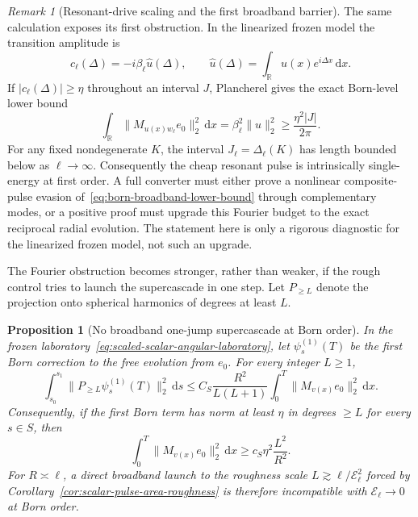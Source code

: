 \documentclass[11pt]{article}
\newcommand{\dd}{\,\mathrm d}
\newtheorem{proposition}[theorem]{Proposition}
\theoremstyle{definition}
\theoremstyle{remark}
\newtheorem{remark}[theorem]{Remark}
\begin{document}
\begin{remark}[Resonant-drive scaling and the first broadband barrier]
The same calculation exposes its first obstruction.  In the linearized
frozen model the transition amplitude is
\begin{equation}
 c_\ell(\Delta)=-i\beta_\ell\widehat u(\Delta),
 \qquad
 \widehat u(\Delta)=\int_\mathbb R u(x)e^{i\Delta x}\dd x.
 \label{eq:born-resonant-amplitude}
\end{equation}
If $|c_\ell(\Delta)|\geq\eta$ throughout an interval $J$, Plancherel gives
the exact Born-level lower bound
\begin{equation}
 \int_\mathbb R\|M_{u(x)w_\ell}e_0\|_2^2\dd x
 =\beta_\ell^2\|u\|_2^2
 \geq\frac{\eta^2|J|}{2\pi}.
 \label{eq:born-broadband-lower-bound}
\end{equation}
For any fixed nondegenerate $K$, the interval
$J_\ell=\Delta_\ell(K)$ has length bounded below as $\ell\to\infty$.
Consequently the cheap resonant pulse is intrinsically single-energy at first
order.  A full converter must either prove a nonlinear composite-pulse
evasion of~\eqref{eq:born-broadband-lower-bound} through complementary modes,
or a positive proof must upgrade this Fourier budget to the exact reciprocal
radial evolution.  The statement here is only a rigorous diagnostic for the
linearized frozen model, not such an upgrade.
\end{remark}

The Fourier obstruction becomes stronger, rather than weaker, if the rough
control tries to launch the supercascade in one step.  Let $P_{\geq L}$ denote
the projection onto spherical harmonics of degrees at least $L$.

\begin{proposition}[No broadband one-jump supercascade at Born order]
\label{prop:born-high-band-recoil}
In the frozen laboratory~\eqref{eq:scaled-scalar-angular-laboratory}, let
$\psi_s^{(1)}(T)$ be the first Born correction to the free evolution from
$e_0$.  For every integer $L\geq1$,
\begin{equation}
 \int_{s_0}^{s_1}
 \|P_{\geq L}\psi_s^{(1)}(T)\|_2^2\dd s
 \leq C_S\frac{R^2}{L(L+1)}
 \int_0^T\|M_{v(x)}e_0\|_2^2\dd x.
 \label{eq:born-high-band-recoil}
\end{equation}
Consequently, if the first Born term has norm at least $\eta$ in degrees
$\geq L$ for every $s\in S$, then
\begin{equation}
 \int_0^T\|M_{v(x)}e_0\|_2^2\dd x
 \geq c_S\eta^2\frac{L^2}{R^2}.
 \label{eq:born-one-jump-cost}
\end{equation}
For $R\asymp\ell$, a direct broadband launch to the roughness scale
$L\gtrsim\ell/\mathcal E_\ell^2$ forced by
Corollary~\ref{cor:scalar-pulse-area-roughness} is therefore incompatible with
$\mathcal E_\ell\to0$ at Born order.
\end{proposition}
\end{document}
